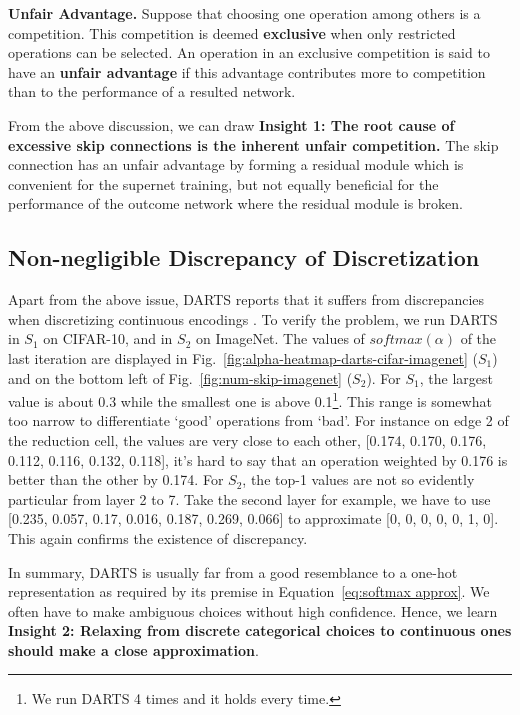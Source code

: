 \documentclass[runningheads]{llncs}
\begin{document}
\begin{definition}
	\label{def:unfair}
	\textbf{Unfair Advantage.}  Suppose that choosing one operation among others is a competition. This competition is deemed \textbf{exclusive} when only restricted operations  can be selected. An operation in an exclusive competition is said to have an \textbf{unfair advantage} if this advantage contributes more to competition than to the performance of a resulted network.
\end{definition}

From the above discussion, we can draw 
\textbf{Insight 1: The root cause of excessive skip connections is the inherent unfair competition.} The skip connection has an unfair advantage by forming a residual module which is convenient for the supernet training, but not equally beneficial for the performance of the outcome network where the residual module is broken.



\subsection{Non-negligible Discrepancy of Discretization}\label{sec:problem of discrepancy}
Apart from the above issue, DARTS reports that it suffers from discrepancies when discretizing continuous encodings \cite{liu2018darts}. 
To verify the problem, we run DARTS in $S_1$ on CIFAR-10, and in $S_2$ on ImageNet. The values of $softmax(\alpha)$ of the last iteration are displayed in Fig.~\ref{fig:alpha-heatmap-darts-cifar-imagenet} ($S_1$) and on the bottom left of Fig.~\ref{fig:num-skip-imagenet} ($S_2$). For $S_1$,  the largest value is about 0.3 while the smallest one is above 0.1\footnote{We run DARTS 4 times and it holds every time.}. This range is somewhat too narrow to differentiate `good' operations from `bad'. For instance on edge 2 of the reduction cell, the values are very close to each other, [0.174, 0.170, 0.176, 0.112, 0.116, 0.132, 0.118], it's hard to say that an operation weighted by 0.176 is better than the other by 0.174.  
For $S_2$, the top-1 values are not so evidently particular from layer 2 to 7. Take the second layer for example, we have to use [0.235, 0.057, 0.17,  0.016, 0.187, 0.269, 0.066] to approximate [0, 0, 0, 0, 0, 1, 0]. This again confirms the existence of discrepancy.



In summary, DARTS is usually far from a good resemblance to a one-hot representation as required by its premise in Equation~\ref{eq:softmax approx}. We often have to make ambiguous choices without high confidence. Hence, we learn 
\textbf{Insight 2: Relaxing from discrete categorical choices to continuous ones should make a close approximation}.
\end{document}
